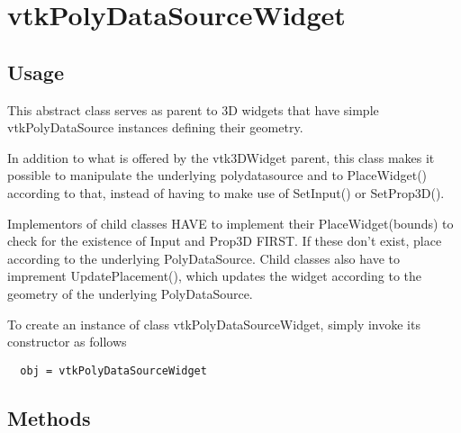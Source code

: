 \section{vtkPolyDataSourceWidget}

\subsection{Usage}

 This abstract class serves as parent to 3D widgets that have simple
 vtkPolyDataSource instances defining their geometry.

 In addition to what is offered by the vtk3DWidget parent, this class
 makes it possible to manipulate the underlying polydatasource and to
 PlaceWidget() according to that, instead of having to make use of
 SetInput() or SetProp3D().

 Implementors of child classes HAVE to implement their PlaceWidget(bounds)
 to check for the existence of Input and Prop3D FIRST.  If these don't
 exist, place according to the underlying PolyDataSource.  Child classes
 also have to imprement UpdatePlacement(), which updates the widget according
 to the geometry of the underlying PolyDataSource.

To create an instance of class vtkPolyDataSourceWidget, simply
invoke its constructor as follows
\begin{verbatim}
  obj = vtkPolyDataSourceWidget
\end{verbatim}
\subsection{Methods}

